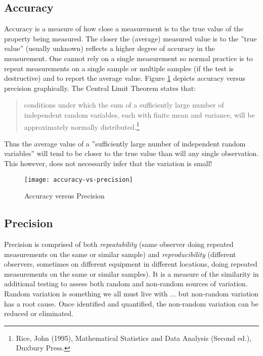 \subsection{Accuracy}
Accuracy is a measure of how close a measurement is to the true value of the property being measured.  The closer the (average) measured value is to the ''true value'' (usually unknown) reflects a higher degree of accuracy in the measurement.  One cannot rely on a single measurement so normal practice is to repeat measurements on a single sample or multiple samples (if the test is destructive) and to report the average value. Figure \ref{fig1} depicts accuracy versus precision graphically. The Central Limit Theorem states that:
\begin{quote}
conditions under which the sum of a sufficiently large number of independent random variables, each with finite mean and variance, will be approximately normally distributed.\footnote{Rice, John (1995), Mathematical Statistics and Data Analysis (Second ed.), Duxbury Press.} 
\end{quote}
Thus the average value of a ''sufficiently large number of independent random variables'' will tend to be closer to the true value than will any single observation.  This however, does not necessarily infer that the variation is small!

\begin{figure}[h]\caption{Accuracy versus Precision}\label{fig1}
\begin{center}
\texttt{[image: accuracy-vs-precision]}
\end{center}
\end{figure}

\subsection{Precision}
Precision is comprised of both \textit{repeatability} (same observer doing repeated measurements on the same or similar sample) and \textit{reproducibility} (different observers, sometimes on different equipment in different locations, doing repeated measurements on the same or similar samples).  It is a measure of the similarity in additional testing to assess both random and non-random sources of variation.  Random variation is something we all must live with ... but non-random variation has a root cause.  Once identified and quantified, the non-random variation can be reduced or eliminated.

